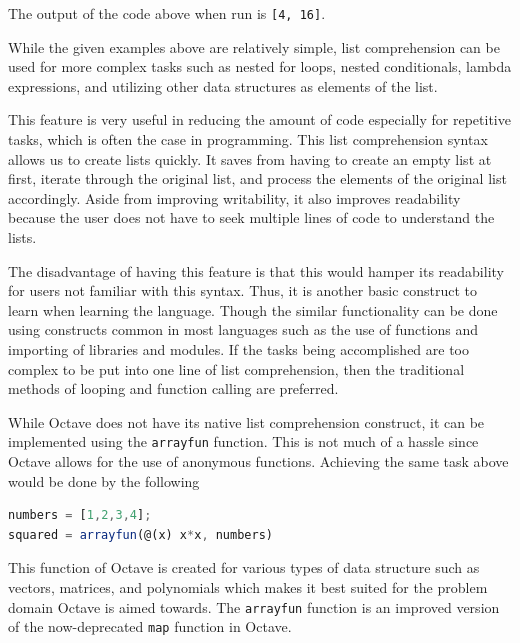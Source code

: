 \documentclass{article}
\begin{document}
\par
The output of the code above when run is \texttt{[4, 16]}.
\par
While the given examples above are relatively simple, list comprehension can be used for more complex tasks such as nested for loops, nested conditionals, lambda expressions, and utilizing other data structures as elements of the list.
\par
This feature is very useful in reducing the amount of code especially for repetitive tasks, which is often the case in programming. This list comprehension syntax allows us to create lists quickly. It saves from having to create an empty list at first, iterate through the original list, and process the elements of the original list accordingly. Aside from improving writability, it also improves readability because the user does not have to seek multiple lines of code to understand the lists.
\par
The disadvantage of having this feature is that this would hamper its readability for users not familiar with this syntax. Thus, it is another basic construct to learn when learning the language. Though the similar functionality can be done using constructs common in most languages such as the use of functions and importing of libraries and modules. If the tasks being accomplished are too complex to be put into one line of list comprehension, then the traditional methods of looping and function calling are preferred.
\par
While Octave does not have its native list comprehension construct, it can be implemented using the \texttt{arrayfun} function. This is not much of a hassle since Octave allows for the use of anonymous functions. Achieving the same task above would be done by the following

\begin{lstlisting}[language=Octave]
numbers = [1,2,3,4];
squared = arrayfun(@(x) x*x, numbers)
\end{lstlisting}


\par
This function of Octave is created for various types of data structure such as vectors, matrices, and polynomials which makes it best suited for the problem domain Octave is aimed towards. The \texttt{arrayfun} function is an improved version of the now-deprecated \texttt{map} function in Octave.

\end{document}
